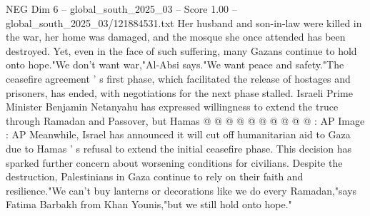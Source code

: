 \begin{textsample}{NEG Dim 6 – global\_south\_2025\_03 – Score 1.00 – global\_south\_2025\_03/121884531.txt}
Her husband and son-in-law were killed in the war, her home was damaged, and the mosque she once attended has been destroyed.
Yet, even in the face of such suffering, many Gazans continue to hold onto hope."We don't want war,"Al-Absi says."We want peace and safety."The ceasefire agreement ' s first phase, which facilitated the release of hostages and prisoners, has ended, with negotiations for the next phase stalled.
Israeli Prime Minister Benjamin Netanyahu has expressed willingness to extend the truce through Ramadan and Passover, but Hamas @ @ @ @ @ @ @ @ @ @ : AP Image : AP Meanwhile, Israel has announced it will cut off humanitarian aid to Gaza due to Hamas ' s refusal to extend the initial ceasefire phase.
This decision has sparked further concern about worsening conditions for civilians.
Despite the destruction, Palestinians in Gaza continue to rely on their faith and resilience."We can't buy lanterns or decorations like we do every Ramadan,"says Fatima Barbakh from Khan Younis,"but we still hold onto hope."

\end{textsample}
